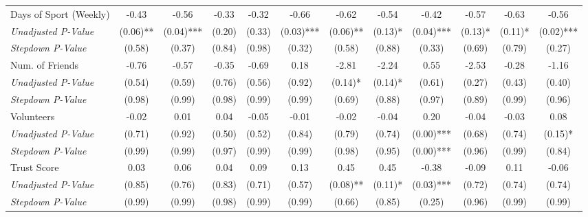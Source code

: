 \begin{tabular}{l c c c c c c c c c c c}
Days of Sport (Weekly) & -0.43 & -0.56 & -0.33 & -0.32 & -0.66 & -0.62 & -0.54 & -0.42 & -0.57 & -0.63 & -0.56 \\
\quad \textit{Unadjusted P-Value} & (0.06)** & (0.04)*** & (0.20) & (0.33) & (0.03)*** & (0.06)** & (0.13)* & (0.04)*** & (0.13)* & (0.11)* & (0.02)*** \\
\quad \textit{Stepdown P-Value} & (0.58) & (0.37) & (0.84) & (0.98) & (0.32) & (0.58) & (0.88) & (0.33) & (0.69) & (0.79) & (0.27) \\
Num. of Friends & -0.76 & -0.57 & -0.35 & -0.69 & 0.18 & -2.81 & -2.24 & 0.55 & -2.53 & -0.28 & -1.16 \\
\quad \textit{Unadjusted P-Value} & (0.54) & (0.59) & (0.76) & (0.56) & (0.92) & (0.14)* & (0.14)* & (0.61) & (0.27) & (0.43) & (0.40) \\
\quad \textit{Stepdown P-Value} & (0.98) & (0.99) & (0.98) & (0.99) & (0.99) & (0.69) & (0.88) & (0.97) & (0.89) & (0.99) & (0.96) \\
Volunteers & -0.02 & 0.01 & 0.04 & -0.05 & -0.01 & -0.02 & -0.04 & 0.20 & -0.04 & -0.03 & 0.08 \\
\quad \textit{Unadjusted P-Value} & (0.71) & (0.92) & (0.50) & (0.52) & (0.84) & (0.79) & (0.74) & (0.00)*** & (0.68) & (0.74) & (0.15)* \\
\quad \textit{Stepdown P-Value} & (0.99) & (0.99) & (0.97) & (0.99) & (0.99) & (0.98) & (0.95) & (0.00)*** & (0.96) & (0.99) & (0.84) \\
Trust Score & 0.03 & 0.06 & 0.04 & 0.09 & 0.13 & 0.45 & 0.45 & -0.38 & -0.09 & 0.11 & -0.06 \\
\quad \textit{Unadjusted P-Value} & (0.85) & (0.76) & (0.83) & (0.71) & (0.57) & (0.08)** & (0.11)* & (0.03)*** & (0.72) & (0.74) & (0.74) \\
\quad \textit{Stepdown P-Value} & (0.99) & (0.99) & (0.98) & (0.99) & (0.99) & (0.66) & (0.85) & (0.25) & (0.96) & (0.99) & (0.99) \\
\bottomrule
\end{tabular}
